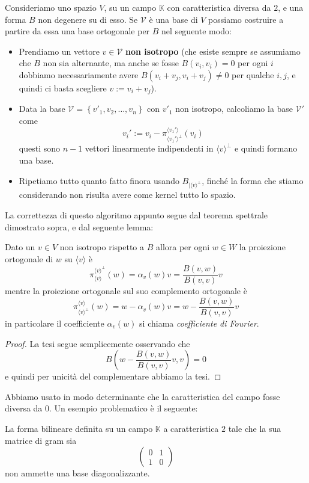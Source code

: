 \documentclass[11pt]{scrartcl}
\newcommand{\KK}{\mathbb{K}}
\begin{document}
	\begin{algorithm}
		Consideriamo uno spazio $V$, su un campo $\KK$ con caratteristica diversa da $2$, e una forma $B$ non degenere su di esso. Se $\mathcal{V}$ è una base di $V$ possiamo costruire a partire da essa una base ortogonale per $B$ nel seguente modo:
		\begin{itemize}
			\item Prendiamo un vettore $v\in \mathcal{V}$ \textbf{non isotropo} (che esiste sempre se assumiamo che $B$ non sia alternante, ma anche se fosse $B(v_i,v_i)=0$  per ogni $i$ dobbiamo necessariamente avere $B(v_i+v_j,v_i+v_j)\ne 0$ per qualche $i,j$, e quindi ci basta scegliere $v:=v_i+v_j$).
			\item Data la base $\mathcal{V}=\left\{v'_1,v_2,\dots,v_n\right\}$ con $v'_1$ non isotropo, calcoliamo la base $\mathcal{V}'$ come
			$$v_i':=v_i-\pi_{\langle v_1' \rangle^\perp}^{\langle v_1' \rangle}(v_i)$$
			questi sono $n-1$ vettori linearmente indipendenti in $\langle v \rangle^\perp$ e quindi formano una base. 
			\item Ripetiamo tutto quanto fatto finora usando $B_{\mid \langle v \rangle^\perp}$, finché la forma che stiamo considerando non risulta avere come kernel tutto lo spazio.
		\end{itemize}
	\end{algorithm}
	La correttezza di questo algoritmo appunto segue dal teorema spettrale dimostrato sopra, e dal seguente lemma:
	\begin{lemma}
		Dato un $v\in V$ non isotropo rispetto a $B$ allora per ogni $w\in W$ la proiezione ortogonale di $w$ su $\langle v \rangle$ è
		$$\pi_{\langle v \rangle}^{\langle v \rangle^\perp}(w)=\alpha_v(w)v=\frac{B(v,w)}{B(v,v)}v$$
		mentre la proiezione ortogonale sul suo complemento ortogonale è
		$$\pi_{\langle v \rangle^\perp}^{\langle v \rangle}(w)=w-\alpha_v(w)v=w-\frac{B(v,w)}{B(v,v)}v$$
		in particolare il coefficiente $\alpha_v(w)$ si chiama \textit{coefficiente di Fourier}.
	\end{lemma}
	\begin{proof}
		La tesi segue semplicemente osservando che 
		$$B\left(w-\frac{B(v,w)}{B(v,v)}v,v\right)=0$$
		e quindi per unicità del complementare abbiamo la tesi.
	\end{proof}
	Abbiamo usato in modo determinante che la caratteristica del campo fosse diversa da $0$. Un esempio problematico è il seguente:
	\begin{example}
		La forma bilineare definita su un campo $\KK$ a caratteristica $2$ tale che la sua matrice di gram sia
		$$
		\begin{pmatrix}
			0 & 1 \\
			1 & 0
		\end{pmatrix}
		$$
		non ammette una base diagonalizzante.
	\end{example}
\end{document}
